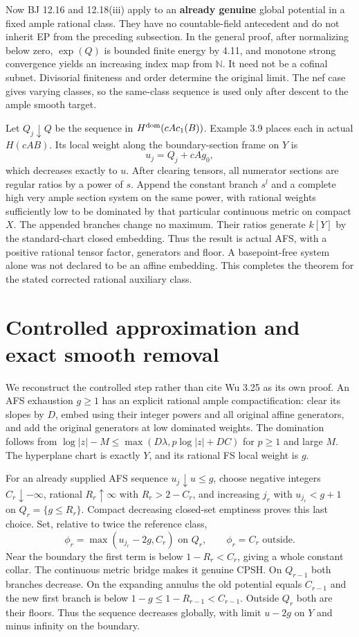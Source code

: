 \documentclass[
  10pt,
]{article}
\begin{document}
Now BJ 12.16 and 12.18(iii) apply to an \textbf{already genuine} global
potential in a fixed ample rational class. They have no countable-field
antecedent and do not inherit EP from the preceding subsection. In the
general proof, after normalizing below zero, \(\exp(Q)\) is bounded
finite energy by 4.11, and monotone strong convergence yields an
increasing index map from \(\mathbb N\). It need not be a cofinal
subnet. Divisorial finiteness and order determine the original limit.
The nef case gives varying classes, so the same-class sequence is used
only after descent to the ample smooth target.

Let \(Q_j\downarrow Q\) be the sequence in \(H^{\rm dom}(cA c_1(B))\).
Example 3.9 places each in actual \(H(cAB)\). Its local weight along the
boundary-section frame on \(Y\) is \[u_j=Q_j+cAg_0,\] which decreases
exactly to \(u\). After clearing tensors, all numerator sections are
regular ratios by a power of \(s\). Append the constant branch \(s^l\)
and a complete high very ample section system on the same power, with
rational weights sufficiently low to be dominated by that particular
continuous metric on compact \(X\). The appended branches change no
maximum. Their ratios generate \(k[Y]\) by the standard-chart closed
embedding. Thus the result is actual AFS, with a positive rational
tensor factor, generators and floor. A basepoint-free system alone was
not declared to be an affine embedding. This completes the theorem for
the stated corrected rational auxiliary class.

\section{Controlled approximation and exact smooth
removal}\label{controlled-approximation-and-exact-smooth-removal}

We reconstruct the controlled step rather than cite Wu 3.25 as its own
proof. An AFS exhaustion \(g\ge1\) has an explicit rational ample
compactification: clear its slopes by \(D\), embed using their integer
powers and all original affine generators, and add the original
generators at low dominated weights. The domination follows from
\(\log|z|-M\le\max(D\lambda,p\log|z|+DC)\) for \(p\ge1\) and large
\(M\). The hyperplane chart is exactly \(Y\), and its rational FS local
weight is \(g\).

For an already supplied AFS sequence \(u_j\downarrow u\le g\), choose
negative integers \(C_r\downarrow-\infty\), rational
\(R_r\uparrow\infty\) with \(R_r>2-C_r\), and increasing \(j_r\) with
\(u_{j_r}<g+1\) on \(Q_r=\{g\le R_r\}\). Compact decreasing closed-set
emptiness proves this last choice. Set, relative to twice the reference
class,
\[\phi_r=\max(u_{j_r}-2g,C_r)\text{ on }Q_r,\qquad \phi_r=C_r\text{ outside}. \tag{19}\]
Near the boundary the first term is below \(1-R_r<C_r\), giving a whole
constant collar. The continuous metric bridge makes it genuine CPSH. On
\(Q_{r-1}\) both branches decrease. On the expanding annulus the old
potential equals \(C_{r-1}\) and the new first branch is below
\(1-g\le1-R_{r-1}<C_{r-1}\). Outside \(Q_r\) both are their floors. Thus
the sequence decreases globally, with limit \(u-2g\) on \(Y\) and minus
infinity on the boundary.
\end{document}
